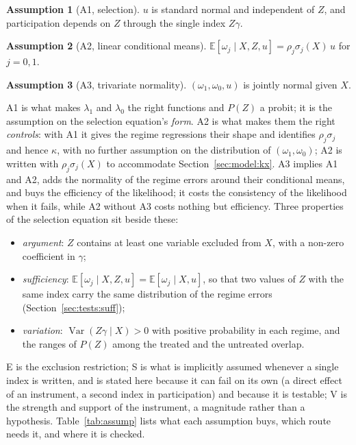 \documentclass[11pt,a4paper]{article}
\theoremstyle{plain}
\theoremstyle{definition}
\newtheorem{assumption}{Assumption}
\theoremstyle{remark}
\newcommand{\E}{\mathbb{E}}
\newcommand{\Var}{\operatorname{Var}}
\newcommand{\1}{\mathbf{1}}
\begin{document}
\begin{assumption}[A1, selection]\label{as:a1}
$u$ is standard normal and independent of $Z$, and participation depends
on $Z$ through the single index $Z\gamma$.
\end{assumption}
\begin{assumption}[A2, linear conditional means]\label{as:a2}
$\E[\omega_j\mid X,Z,u]=\rho_j\sigma_j(X)\,u$ for $j=0,1$.
\end{assumption}
\begin{assumption}[A3, trivariate normality]\label{as:a3}
$(\omega_1,\omega_0,u)$ is jointly normal given $X$.
\end{assumption}

A1 is what makes $\lambda_1$ and $\lambda_0$ the right functions and $P(Z)$
a probit; it is the assumption on the selection equation's \emph{form}.
A2 is what makes them the right \emph{controls}: with A1 it gives the
regime regressions their shape and identifies $\rho_j\sigma_j$ and hence
$\kappa$, with no further assumption on the distribution of
$(\omega_1,\omega_0)$; A2 is written with $\rho_j\sigma_j(X)$ to
accommodate Section~\ref{sec:model:kx}. A3 implies A1 and A2, adds the
normality of the regime errors around their conditional means, and buys
the efficiency of the likelihood; it costs the consistency of the
likelihood when it fails, while A2 without A3 costs nothing but
efficiency. Three properties of the selection equation sit beside these:
\begin{itemize}
\item[(E)] \emph{argument}: $Z$ contains at least one variable excluded
from $X$, with a non-zero coefficient in $\gamma$;
\item[(S)] \emph{sufficiency}: $\E[\omega_j\mid X,Z,u]=\E[\omega_j\mid X,u]$,
so that two values of $Z$ with the same index carry the same distribution
of the regime errors (Section~\ref{sec:tests:suff});
\item[(V)] \emph{variation}: $\Var(Z\gamma\mid X)>0$ with positive
probability in each regime, and the ranges of $P(Z)$ among the treated
and the untreated overlap.
\end{itemize}
E is the exclusion restriction; S is what is implicitly assumed whenever
a single index is written, and is stated here because it can fail on its
own (a direct effect of an instrument, a second index in participation)
and because it is testable; V is the strength and support of the
instrument, a magnitude rather than a hypothesis. Table~\ref{tab:assump}
lists what each assumption buys, which route needs it, and where it is
checked.
\end{document}
